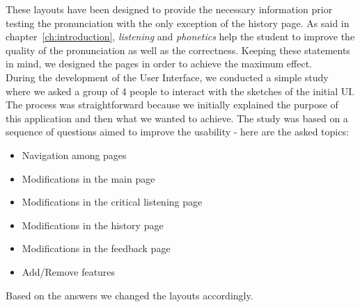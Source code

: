 \noindent These layouts have been designed to provide the necessary information prior testing the pronunciation with the only exception of the history page. As said in chapter~\ref{ch:introduction}, \textit{listening} and \textit{phonetics} help the student to improve the quality of the pronunciation as well as the correctness. Keeping these statements in mind, we designed the pages in order to achieve the maximum effect. \\

\noindent During the development of the User Interface, we conducted a simple study where we asked a group of 4 people to interact with the sketches of the initial UI. The process was straightforward because we initially explained the purpose of this application and then what we wanted to achieve. The study was based on a sequence of questions aimed to improve the usability - here are the asked topics:

\begin{itemize}
	\item Navigation among pages
	\item Modifications in the main page
	\item Modifications in the critical listening page
	\item Modifications in the history page
	\item Modifications in the feedback page
	\item Add/Remove features
\end{itemize}

\noindent Based on the answers we changed the layouts accordingly.

